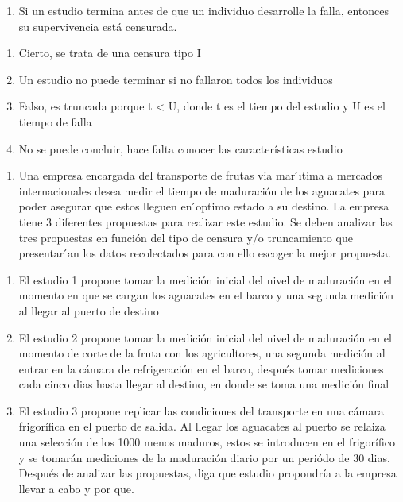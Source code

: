 \documentclass[
  a4paper,
  oneside,
  openany]{book}
\providecommand{\tightlist}{%
  \setlength{\itemsep}{0pt}\setlength{\parskip}{0pt}}
\begin{document}
\begin{enumerate}
\def\labelenumi{\arabic{enumi}.}
\setcounter{enumi}{1}
\tightlist
\item
  Si un estudio termina antes de que un individuo desarrolle la falla, entonces su supervivencia está censurada.
\end{enumerate}

\begin{enumerate}
\def\labelenumi{\alph{enumi}.}
\tightlist
\item
  Cierto, se trata de una censura tipo I
\item
  Un estudio no puede terminar si no fallaron todos los individuos
\item
  Falso, es truncada porque t \textless{} U, donde t es el tiempo del estudio y U es el tiempo de falla
\item
  No se puede concluir, hace falta conocer las características estudio
\end{enumerate}

\begin{enumerate}
\def\labelenumi{\arabic{enumi}.}
\setcounter{enumi}{2}
\tightlist
\item
  Una empresa encargada del transporte de frutas via mar ́ıtima a mercados internacionales desea medir el tiempo de maduración de los aguacates para poder asegurar que estos lleguen en ́optimo estado a su destino. La empresa tiene 3 diferentes propuestas para realizar este estudio. Se deben analizar las tres propuestas en función del tipo de censura y/o truncamiento que presentar ́an los datos recolectados para con ello escoger la mejor propuesta.
\end{enumerate}

\begin{enumerate}
\def\labelenumi{\alph{enumi}.}
\tightlist
\item
  El estudio 1 propone tomar la medición inicial del nivel de maduración en el momento en que se cargan los aguacates en el barco y una segunda medición al llegar al puerto de destino
\item
  El estudio 2 propone tomar la medición inicial del nivel de maduración en el momento de corte de la fruta con los agricultores, una segunda medición al entrar en la cámara de refrigeración en el barco, después tomar mediciones cada cinco dias hasta llegar al destino, en donde se toma una medición final
\item
  El estudio 3 propone replicar las condiciones del transporte en una cámara frigorífica en el puerto de salida. Al llegar los aguacates al puerto se relaiza una selección de los 1000 menos maduros, estos se introducen en el frigorífico y se tomarán mediciones de la maduración diario por un periódo de 30 dias.
  Después de analizar las propuestas, diga que estudio propondría a la empresa llevar a cabo y por que.
\end{enumerate}
\end{document}
